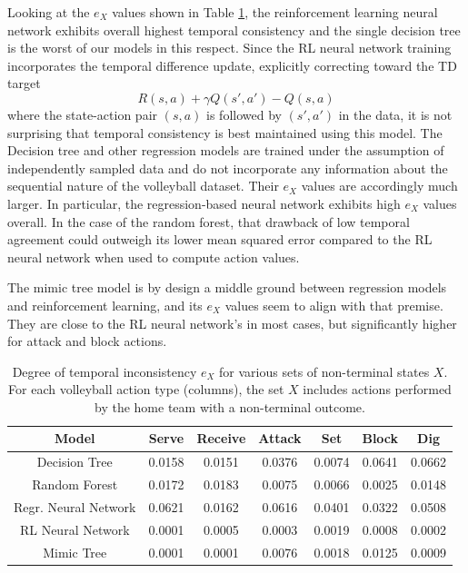 \documentclass{sfuthesis}
\begin{document}
	Looking at the $e_X$ values shown in Table \ref{tab:bellman-agreement}, the reinforcement learning neural network exhibits overall highest temporal consistency and the single decision tree is the worst of our models in this respect. Since the RL neural network training incorporates the temporal difference update, explicitly correcting toward the TD target
	$$R(s,a) + \gamma Q(s', a') - Q(s,a)$$
	where the state-action pair $(s,a)$ is followed by $(s',a')$ in the data, it is not surprising that temporal consistency is best maintained using this model. The Decision tree and other regression models are trained under the assumption of independently sampled data and do not incorporate any information about the sequential nature of the volleyball dataset. Their $e_X$ values are accordingly much larger. In particular, the regression-based neural network exhibits high $e_X$ values overall. In the case of the random forest, that drawback of low temporal agreement could outweigh its lower mean squared error compared to the RL neural network when used to compute action values.
	
	The mimic tree model is by design a middle ground between regression models and reinforcement learning, and its $e_X$ values seem to align with that premise. They are close to the RL neural network's in most cases, but significantly higher for attack and block actions.
	
	\begin{table}
		\centering
		\begin{tabular}{c|cccccc}
			\textbf{Model}    & \textbf{Serve} & \textbf{Receive} & \textbf{Attack} & \textbf{Set} & \textbf{Block} & \textbf{Dig} \\ \hline
			Decision Tree     & 0.0158                  & 0.0151                    & 0.0376                   & 0.0074                & 0.0641                  & 0.0662                \\
			Random Forest     & 0.0172                  & 0.0183                    & 0.0075                   & 0.0066                & 0.0025                  & 0.0148                \\
			Regr. Neural Network & 0.0621                  & 0.0162                    & 0.0616                   & 0.0401                & 0.0322                 & 0.0508                \\
			RL Neural Network & 0.0001                  & 0.0005                    & 0.0003                   & 0.0019                & 0.0008                  & 0.0002                \\
			Mimic Tree        & 0.0001                  & 0.0001                    & 0.0076                   & 0.0018                & 0.0125                  & 0.0009               
		\end{tabular}
		\caption{Degree of temporal inconsistency $e_X$ for various sets of non-terminal states $X$. For each volleyball action type (columns), the set $X$ includes actions performed by the home team with a non-terminal outcome.}
		\label{tab:bellman-agreement}
	\end{table}
	
\end{document}
